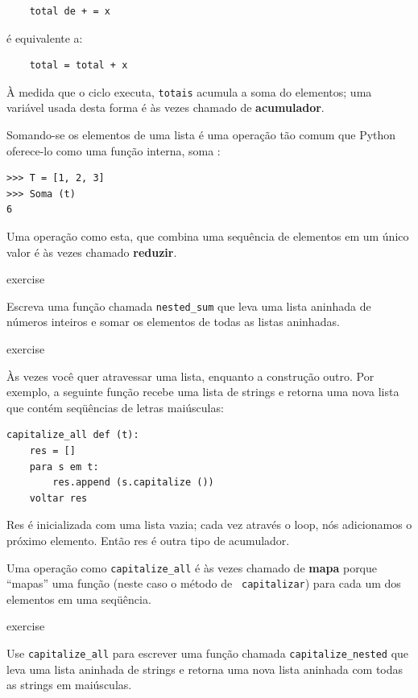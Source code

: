 \documentclass[10pt]{book}
\begin{document}
\begin{exercise}
\begin{verbatim}
    total de + = x
\end{verbatim}
%
é equivalente a:

\begin{verbatim}
    total = total + x
\end{verbatim}
%
À medida que o ciclo executa, {\tt totais} acumula a soma do
elementos; uma variável usada desta forma é às vezes chamado de
{\bf acumulador}.

Somando-se os elementos de uma lista é uma operação tão comum
que Python oferece-lo como uma função interna, {soma \tt}:

\begin{verbatim}
>>> T = [1, 2, 3]
>>> Soma (t)
6
\end{verbatim}
%
Uma operação como esta, que combina uma sequência de elementos em
um único valor é às vezes chamado {\bf reduzir}.

\begin{} exercise

Escreva uma função chamada \verb "nested_sum" que leva uma lista aninhada
de números inteiros e somar os elementos de todas as listas aninhadas.

\end{} exercise

Às vezes você quer atravessar uma lista, enquanto a construção
outro. Por exemplo, a seguinte função recebe uma lista de strings
e retorna uma nova lista que contém seqüências de letras maiúsculas:

\begin{verbatim}
capitalize_all def (t):
    res = []
    para s em t:
        res.append (s.capitalize ())
    voltar res
\end{verbatim}
%
{Res \tt} é inicializada com uma lista vazia; cada vez através
o loop, nós adicionamos o próximo elemento. Então {res \tt} é outra
tipo de acumulador.

Uma operação como \verb "capitalize_all" é às vezes chamado de {\bf
mapa} porque ``mapas'' uma função (neste caso o método de {\tt
capitalizar}) para cada um dos elementos em uma seqüência.

\begin{} exercise

Use \verb "capitalize_all" para escrever uma função chamada \verb "capitalize_nested"
que leva uma lista aninhada de strings e retorna uma nova lista aninhada
com todas as strings em maiúsculas.


\end{}
\end{exercise}
\end{document}
